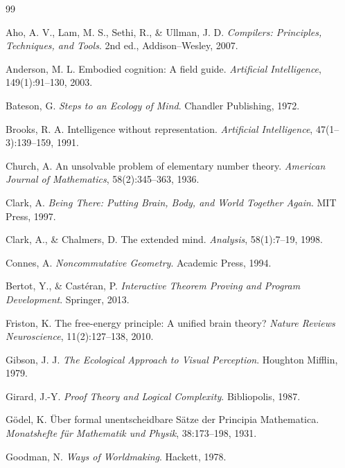 \documentclass[12pt,oneside]{article}
\theoremstyle{remark}
\begin{document}
\begin{thebibliography}{99}

Aho, A. V., Lam, M. S., Sethi, R., \& Ullman, J. D.
\newblock \emph{Compilers: Principles, Techniques, and Tools}.
\newblock 2nd ed., Addison--Wesley, 2007.

Anderson, M. L.
\newblock Embodied cognition: A field guide.
\newblock \emph{Artificial Intelligence}, 149(1):91--130, 2003.

Bateson, G.
\newblock \emph{Steps to an Ecology of Mind}.
\newblock Chandler Publishing, 1972.

Brooks, R. A.
\newblock Intelligence without representation.
\newblock \emph{Artificial Intelligence}, 47(1--3):139--159, 1991.

Church, A.
\newblock An unsolvable problem of elementary number theory.
\newblock \emph{American Journal of Mathematics}, 58(2):345--363, 1936.

Clark, A.
\newblock \emph{Being There: Putting Brain, Body, and World Together Again}.
\newblock MIT Press, 1997.

Clark, A., \& Chalmers, D.
\newblock The extended mind.
\newblock \emph{Analysis}, 58(1):7--19, 1998.

Connes, A.
\newblock \emph{Noncommutative Geometry}.
\newblock Academic Press, 1994.

Bertot, Y., \& Castéran, P.
\newblock \emph{Interactive Theorem Proving and Program Development}.
\newblock Springer, 2013.

Friston, K.
\newblock The free-energy principle: A unified brain theory?
\newblock \emph{Nature Reviews Neuroscience}, 11(2):127--138, 2010.

Gibson, J. J.
\newblock \emph{The Ecological Approach to Visual Perception}.
\newblock Houghton Mifflin, 1979.

Girard, J.-Y.
\newblock \emph{Proof Theory and Logical Complexity}.
\newblock Bibliopolis, 1987.

Gödel, K.
\newblock Über formal unentscheidbare Sätze der Principia Mathematica.
\newblock \emph{Monatshefte für Mathematik und Physik}, 38:173--198, 1931.

Goodman, N.
\newblock \emph{Ways of Worldmaking}.
\newblock Hackett, 1978.


\end{thebibliography}
\end{document}
